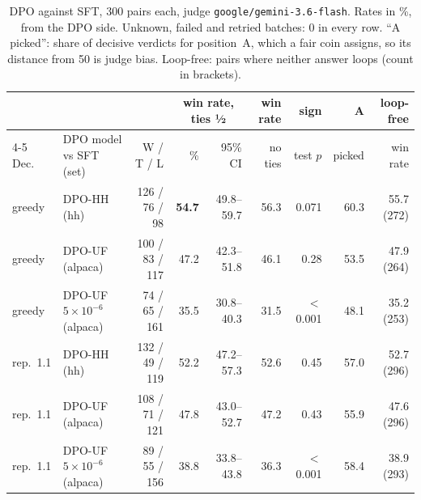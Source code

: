 \begin{table}[!ht]
\centering
\footnotesize
\setlength{\tabcolsep}{3.5pt}
\begin{tabular}{@{}llrrrrrrr@{}}
\toprule
& & & \multicolumn{2}{c}{win rate, ties ½} & win rate & sign & A & loop-free \\
\cmidrule(lr){4-5}
Dec. & DPO model vs SFT (set) & W / T / L & \% & 95\% CI & no ties & test $p$ & picked & win rate \\
\midrule
greedy & DPO-HH (hh) & 126 / 76 / 98 & \textbf{54.7} & 49.8--59.7 & 56.3 & 0.071 & 60.3 & 55.7 (272) \\
greedy & DPO-UF (alpaca) & 100 / 83 / 117 & 47.2 & 42.3--51.8 & 46.1 & 0.28 & 53.5 & 47.9 (264) \\
greedy & DPO-UF $5{\times}10^{-6}$ (alpaca) & 74 / 65 / 161 & 35.5 & 30.8--40.3 & 31.5 & $<$0.001 & 48.1 & 35.2 (253) \\
rep.\ 1.1 & DPO-HH (hh) & 132 / 49 / 119 & 52.2 & 47.2--57.3 & 52.6 & 0.45 & 57.0 & 52.7 (296) \\
rep.\ 1.1 & DPO-UF (alpaca) & 108 / 71 / 121 & 47.8 & 43.0--52.7 & 47.2 & 0.43 & 55.9 & 47.6 (296) \\
rep.\ 1.1 & DPO-UF $5{\times}10^{-6}$ (alpaca) & 89 / 55 / 156 & 38.8 & 33.8--43.8 & 36.3 & $<$0.001 & 58.4 & 38.9 (293) \\
\bottomrule
\end{tabular}
\caption{DPO against SFT, 300 pairs each, judge \texttt{google/gemini-3.6-flash}. Rates in \%, from the DPO side.
Unknown, failed and retried batches: 0 in every row. ``A picked'': share of decisive verdicts for position~A, which a
fair coin assigns, so its distance from 50 is judge bias. Loop-free: pairs where neither answer loops (count in
brackets).}
\label{tab:results}
\end{table}
